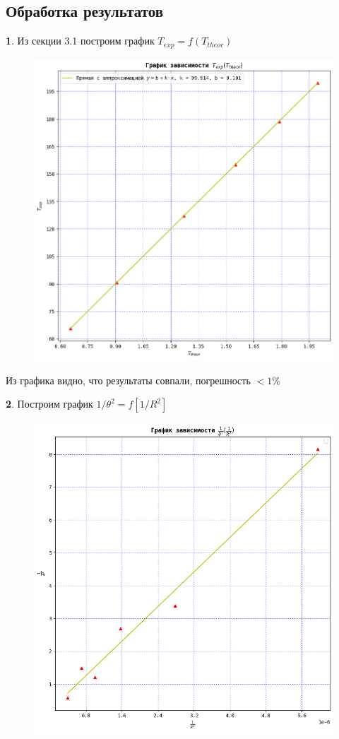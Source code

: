 \documentclass[a4paper,12pt]{article}
\theoremstyle{definition}
\begin{document}
\subsection{Обработка результатов}
\textbf{1}. Из секции 3.1 построим график $T_{exp}=f(T_{theor})$
\begin{figure}[H]
    \centering
    \includegraphics{324_1.png}    
\end{figure}
Из графика видно, что результаты совпали, погрешность $
<1\%$ \par
\textbf{2}.
Построим график $1/\theta^2=f[1/R^2]$
\begin{figure}[H]
    \centering
    \includegraphics{324_2.png}    
\end{figure} \par
\end{document}
